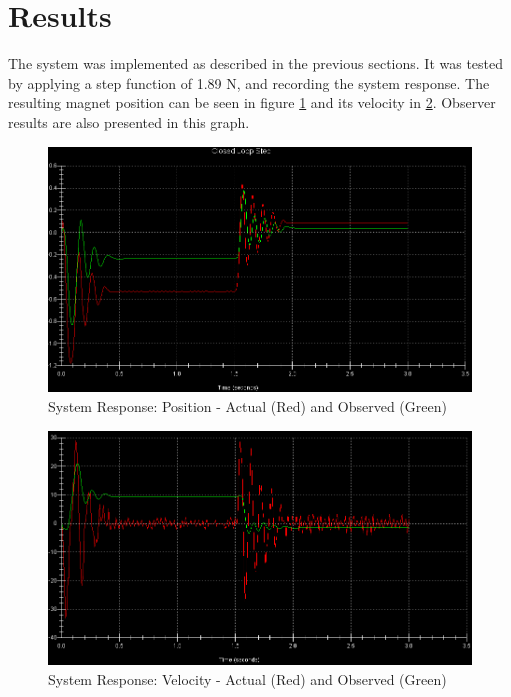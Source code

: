 \section{Results}

The system was implemented as described in the previous sections.
It was tested by applying a step function of 1.89 N, and recording the system response.
The resulting magnet position can be seen in figure \ref{fig:position} and its velocity in \ref{fig:velocity}.
Observer results are also presented in this graph.

\begin{figure}[p]
    \centering
    \includegraphics[width=1\textwidth]{position}
    \caption{System Response: Position - Actual (Red) and Observed (Green)}
    \label{fig:position}
\end{figure}

\begin{figure}[p]
    \centering
    \includegraphics[width=1\textwidth]{velocity}
    \caption{System Response: Velocity - Actual (Red) and Observed (Green)}
    \label{fig:velocity}
\end{figure}
